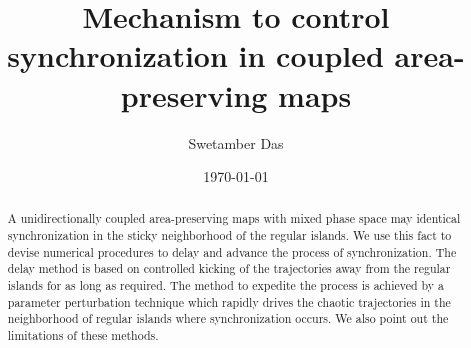 \documentclass[reprint,superscriptaddress,amsmath,amssymb,aps,pre]{revtex4-1}
\begin{document}
\title{Mechanism to control synchronization in coupled area-preserving maps}

\author{Swetamber Das}

\date{\today}

\begin{abstract}
A unidirectionally coupled area-preserving maps with mixed phase space may identical synchronization in the sticky neighborhood of the regular islands. We use this fact to devise numerical procedures to delay and advance the process of synchronization. The delay method is based on controlled kicking of the trajectories away from the regular islands for as long as required. The method to expedite the process is achieved by a parameter perturbation technique which rapidly drives the chaotic trajectories in the neighborhood of regular islands where synchronization occurs. We also point out the limitations of these methods.   
\end{abstract}


\maketitle
\end{document}
